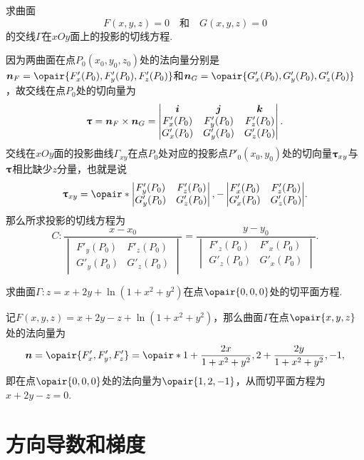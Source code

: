 \begin{example}
求曲面\[
F(x,y,z) = 0
\quad\text{和}\quad
G(x,y,z) = 0
\]的交线\(\Gamma\)在\(xOy\)面上的投影的切线方程.
\begin{solution}
因为两曲面在点\(P_0(x_0,y_0,z_0)\)处的法向量分别是\(\mat{n}_F = \opair{F'_x(P_0),F'_y(P_0),F'_z(P_0)}\)和\(\mat{n}_G = \opair{G'_x(P_0),G'_y(P_0),G'_z(P_0)}\)，故交线在点\(P_0\)处的切向量为\[
\boldsymbol{\uptau}
= \boldsymbol{n}_F \times \boldsymbol{n}_G
= \begin{vmatrix}
\boldsymbol{i} & \boldsymbol{j} & \boldsymbol{k} \\
F'_x(P_0) & F'_y(P_0) & F'_z(P_0) \\
G'_x(P_0) & G'_y(P_0) & G'_z(P_0)
\end{vmatrix}.
\]交线在\(xOy\)面的投影曲线\(\Gamma_{xy}\)在点\(P_0\)处对应的投影点\(P'_0(x_0,y_0)\)处的切向量\(\boldsymbol{\uptau}_{xy}\)与\(\boldsymbol{\uptau}\)相比缺少\(z\)分量，也就是说\[
\mat{\tau}_{xy} = \opair*{\begin{vmatrix}
F'_y(P_0) & F'_z(P_0) \\
G'_y(P_0) & G'_z(P_0)
\end{vmatrix}, -\begin{vmatrix}
F'_x(P_0) & F'_z(P_0) \\
G'_x(P_0) & G'_z(P_0)
\end{vmatrix}}.
\]那么所求投影的切线方程为\[
C: \frac{x - x_0}{\begin{vmatrix}
F'_y(P_0) & F'_z(P_0) \\
G'_y(P_0) & G'_z(P_0)
\end{vmatrix}} = \frac{y - y_0}{\begin{vmatrix}
F'_z(P_0) & F'_x(P_0) \\
G'_z(P_0) & G'_x(P_0)
\end{vmatrix}}.
\]
\end{solution}
\end{example}

\begin{example}
求曲面\(\Gamma: z = x + 2y + \ln(1+x^2+y^2)\)在点\(\opair{0,0,0}\)处的切平面方程.
\begin{solution}
记\(F(x,y,z) = x + 2y - z + \ln(1+x^2+y^2)\)，那么曲面\(\Gamma\)在点\(\opair{x,y,z}\)处的法向量为\[
\mat{n} = \opair{F'_x,F'_y,F'_z}
= \opair*{
1 + \frac{2x}{1+x^2+y^2},
2 + \frac{2y}{1+x^2+y^2},
-1
},
\]即在点\(\opair{0,0,0}\)处的法向量为\(\opair{1,2,-1}\)，从而切平面方程为\(x+2y-z=0\).
\end{solution}
\end{example}

\section{方向导数和梯度}
